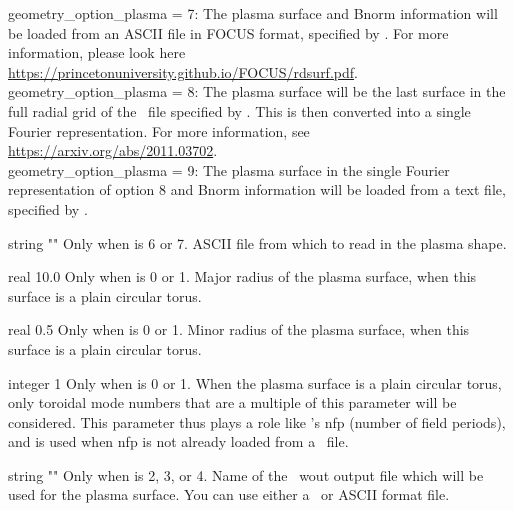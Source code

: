 {{\ttfamily geometry\_option\_plasma} = 7: The plasma surface and Bnorm information will be loaded from an ASCII file in FOCUS format, specified by . For more information, please look here \url{https://princetonuniversity.github.io/FOCUS/rdsurf.pdf}.\\

{\ttfamily geometry\_option\_plasma} = 8: The plasma surface will be the last surface in the full radial grid of the \vmec~file specified by . This is then converted into a single Fourier representation. For more information, see \url{https://arxiv.org/abs/2011.03702}.\\

{\ttfamily geometry\_option\_plasma} = 9: The plasma surface in the single Fourier representation of option 8 and Bnorm information will be loaded from a text file, specified by .

}

\myhrule

{string}
{{\ttfamily ""}}
{Only when  is 6 or 7.}
{ASCII file from which to read in the plasma shape.}

\myhrule

{real}
{10.0}
{Only when  is 0 or 1.}
{Major radius of the plasma surface, when this surface is a plain circular torus.}

\myhrule

{real}
{0.5}
{Only when  is 0 or 1.}
{Minor radius of the plasma surface, when this surface is a plain circular torus.}

\myhrule

{integer}
{1}
{Only when  is 0 or 1.}
{When the plasma surface is a plain circular torus, only toroidal mode numbers that are a multiple of this parameter will be considered.
This parameter thus plays a role like \vmec's {\ttfamily nfp} (number of field periods),
and is used when {\ttfamily nfp} is not already loaded from a \vmec~file.}

\myhrule

{string}
{{\ttfamily ""}}
{Only when  is 2, 3, or 4.}
{Name of the \vmec~{\ttfamily wout} output file which will be used for the plasma surface.
You can use either a \netCDF~or {\ttfamily ASCII} format file.}

